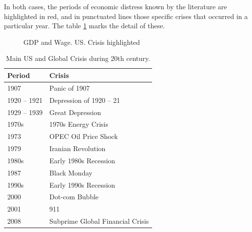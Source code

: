 \documentclass[a4paper,10cpi]{article}
\begin{document}
	In both cases, the periods of economic distress known by the literature are highlighted in red, and in punctuated lines those specific crises that occurred in a particular year. The table \ref{tabla_crisis} marks the detail of these.
	
	
	\begin{figure}[H]
		\centering
		\caption{GDP and Wage. US. Crisis highlighted} \label{fig:series_crisis}
	\end{figure}
	
	
	\begin{table}[ht]
		\centering
		\begin{tabular}{ll}
			\hline
			Period & Crisis \\ 
			\hline
			1907 & Panic of 1907 \\ 
			1920 – 1921 & Depression of 1920 – 21 \\ 
			1929 – 1939 & Great Depression \\ 
			1970s & 1970s Energy Crisis \\ 
			1973 & OPEC Oil Price Shock \\ 
			1979 & Iranian Revolution\\ 
			1980s & Early 1980s Recession\\ 
			1987 & Black Monday \\ 
			1990s & Early 1990s Recession\\ 
			2000 & Dot-com Bubble \\ 
			2001 & 911 \\ 
			2008 & Subprime Global Financial Crisis \\ 
			\hline
		\end{tabular}
		\caption{Main US and Global Crisis during 20th century.}
		\label{tabla_crisis}
	\end{table}
	
\end{document}
